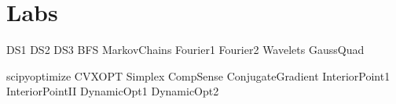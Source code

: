 \documentclass[nociteref]{SIAM-GH-book}
\begin{document}
\part{Labs} %
{DS1}
{DS2}
{DS3}
{BFS}
{MarkovChains}
{Fourier1}
{Fourier2}
{Wavelets}
{GaussQuad}

{scipyoptimize}
{CVXOPT}
{Simplex}
{CompSense} %
{ConjugateGradient}
{InteriorPoint1}
{InteriorPointII}
{DynamicOpt1}
{DynamicOpt2}
\end{document}

